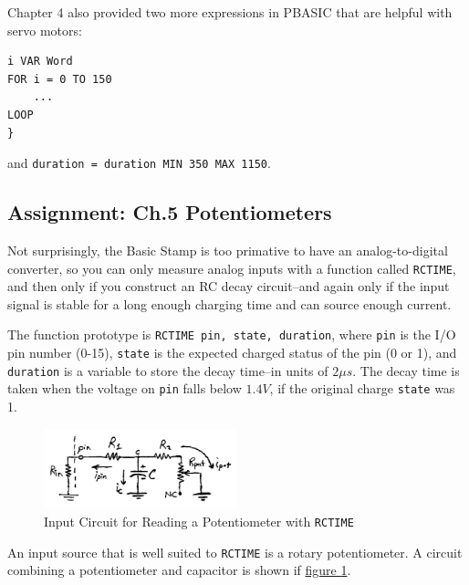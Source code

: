 \documentclass[11pt]{article}
\begin{document}
Chapter 4 also provided two more expressions in PBASIC that are helpful with servo motors:
\begin{verbatim}
i VAR Word
FOR i = 0 TO 150
	...
LOOP
}
\end{verbatim}
and
\texttt{duration = duration MIN 350 MAX 1150}.

\subsection{Assignment: Ch.5 Potentiometers}

Not surprisingly, the Basic Stamp is too primative to have an analog-to-digital converter,
so you can only measure analog inputs with a function called \texttt{RCTIME},
and then only if you construct an RC decay circuit--and again only if the input
signal is stable for a long enough charging time and can source enough current.

The function prototype is \texttt{RCTIME pin, state, duration},
where \texttt{pin} is the I/O pin number (0-15), \texttt{state} is the
expected charged status of the pin (0 or 1), and \texttt{duration} is
a variable to store the decay time--in units of $2\mu s$.
The decay time is taken when the voltage on \texttt{pin} falls below
$1.4V$, if the original charge \texttt{state} was 1.

\begin{figure}[h!]
\centering
\includegraphics[width=0.5\textwidth]{pot-input-circuit.pdf}
\caption{Input Circuit for Reading a Potentiometer with \texttt{RCTIME}}
\label{pot-input-circuit}
\end{figure}

An input source that is well suited to \texttt{RCTIME} is a rotary
potentiometer. A circuit combining a potentiometer and capacitor is shown
if \hyperref[pot-input-circuit]{figure \ref{pot-input-circuit}}.
\end{document}
